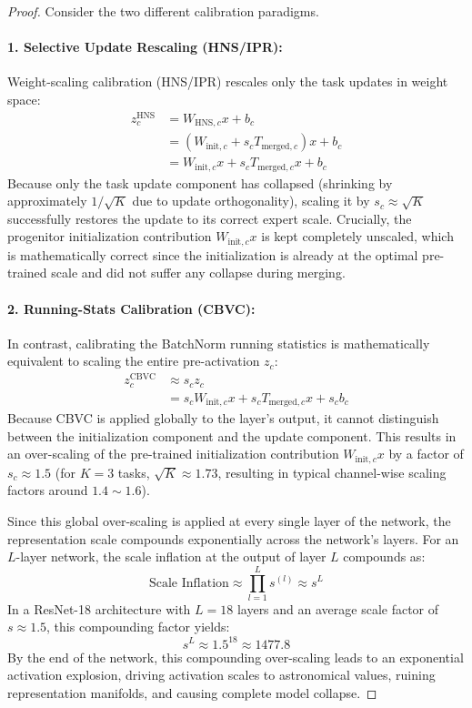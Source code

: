 \documentclass{article}
\begin{document}
\begin{proof}
Consider the two different calibration paradigms.
\paragraph{1. Selective Update Rescaling (HNS/IPR):} Weight-scaling calibration (HNS/IPR) rescales only the task updates in weight space:
\begin{align}
    z^{\text{HNS}}_c &= W_{\text{HNS}, c} x + b_c \\
    &= \left(W_{\text{init}, c} + s_c T_{\text{merged}, c}\right) x + b_c \\
    &= W_{\text{init}, c} x + s_c T_{\text{merged}, c} x + b_c
\end{align}
Because only the task update component has collapsed (shrinking by approximately $1/\sqrt{K}$ due to update orthogonality), scaling it by $s_c \approx \sqrt{K}$ successfully restores the update to its correct expert scale. Crucially, the progenitor initialization contribution $W_{\text{init}, c} x$ is kept completely unscaled, which is mathematically correct since the initialization is already at the optimal pre-trained scale and did not suffer any collapse during merging.

\paragraph{2. Running-Stats Calibration (CBVC):} In contrast, calibrating the BatchNorm running statistics is mathematically equivalent to scaling the entire pre-activation $z_c$:
\begin{align}
    z^{\text{CBVC}}_c &\approx s_c z_c \\
    &= s_c W_{\text{init}, c} x + s_c T_{\text{merged}, c} x + s_c b_c
\end{align}
Because CBVC is applied globally to the layer's output, it cannot distinguish between the initialization component and the update component. This results in an over-scaling of the pre-trained initialization contribution $W_{\text{init}, c} x$ by a factor of $s_c \approx 1.5$ (for $K=3$ tasks, $\sqrt{K} \approx 1.73$, resulting in typical channel-wise scaling factors around $1.4 \sim 1.6$).

Since this global over-scaling is applied at every single layer of the network, the representation scale compounds exponentially across the network's layers. For an $L$-layer network, the scale inflation at the output of layer $L$ compounds as:
\begin{equation}
    \text{Scale Inflation} \approx \prod_{l=1}^L s^{(l)} \approx s^L
\end{equation}
In a ResNet-18 architecture with $L=18$ layers and an average scale factor of $s \approx 1.5$, this compounding factor yields:
\begin{equation}
    s^L \approx 1.5^{18} \approx 1477.8
\end{equation}
By the end of the network, this compounding over-scaling leads to an exponential activation explosion, driving activation scales to astronomical values, ruining representation manifolds, and causing complete model collapse.
\end{proof}
\end{document}
